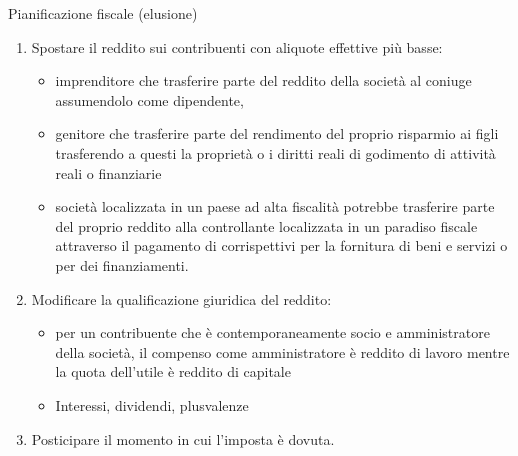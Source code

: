 \documentclass[11pt]{beamer}
\begin{document}
\begin{frame}{Pianificazione fiscale (elusione)}
\begin{enumerate}
\item Spostare il reddito sui contribuenti con aliquote effettive più basse:  
\begin{itemize}
\item imprenditore che trasferire parte del reddito della società al coniuge
assumendolo come dipendente,
\item genitore che trasferire parte del rendimento del proprio risparmio ai
figli trasferendo a questi la proprietà o i diritti reali di godimento di
attività reali o finanziarie
\item società localizzata in un paese ad alta fiscalità potrebbe trasferire
parte del proprio reddito alla controllante localizzata in un paradiso
fiscale attraverso il pagamento di corrispettivi per la fornitura di beni
e servizi o per dei finanziamenti.
\end{itemize}
\item Modificare la qualificazione giuridica del reddito:
\begin{itemize}
\item per un contribuente che è contemporaneamente socio e amministratore della
società, il compenso come amministratore è reddito di lavoro mentre la
quota dell’utile è reddito di capitale
\item Interessi, dividendi, plusvalenze
\end{itemize}
\item Posticipare il momento in cui l’imposta è dovuta.
\end{enumerate}
\end{frame}
\end{document}
